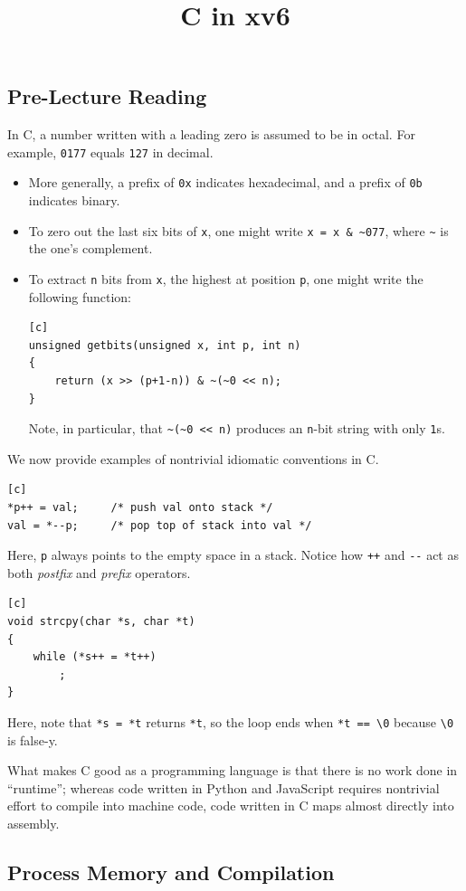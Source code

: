 \title{C in xv6}



\subsection{Pre-Lecture Reading}

In C, a number written with a leading zero
is assumed to be in octal.  For example,
\verb|0177| equals \verb|127| in decimal.
\begin{itemize}
    \item More generally,
    a prefix of \verb|0x| indicates hexadecimal,
    and a prefix of \verb|0b| indicates binary.
    \item To zero out the last six bits of \verb|x|,
    one might write \verb|x = x & ~077|,
    where \verb|~| is the one's complement.
    \item To extract \verb|n| bits from \verb|x|,
    the highest at position \verb|p|, one might write the following function:
\begin{verbatim}[c]
unsigned getbits(unsigned x, int p, int n)
{
    return (x >> (p+1-n)) & ~(~0 << n);
}
\end{verbatim}
    Note, in particular, that \verb|~(~0 << n)|
    produces an \verb|n|-bit string with only \verb|1|s.
\end{itemize}
We now provide examples of nontrivial idiomatic conventions in C.
\begin{verbatim}[c]
*p++ = val;     /* push val onto stack */
val = *--p;     /* pop top of stack into val */
\end{verbatim}
Here, \verb|p| always points to the empty space in a stack.
Notice how \verb|++| and \verb|--| act as both
\emph{postfix} and \emph{prefix} operators.

\begin{verbatim}[c]
void strcpy(char *s, char *t)
{
    while (*s++ = *t++)
        ;
}
\end{verbatim}
Here, note that \verb|*s = *t| returns \verb|*t|,
so the loop ends when \verb|*t == \0| because \verb|\0| is false-y.

What makes C good as a programming language
is that there is no work done in ``runtime'';
whereas code written in Python and JavaScript requires
nontrivial effort to compile into machine code,
code written in C maps almost directly into assembly.

\subsection{Process Memory and Compilation}

